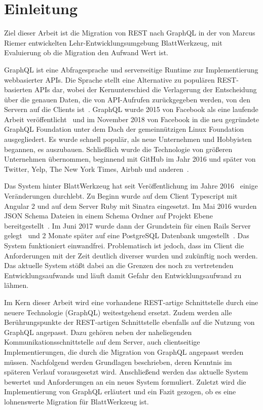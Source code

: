 
\chapter{Einleitung}
\label{sec:introduction}
 
Ziel dieser Arbeit ist die Migration von REST nach GraphQL in der von Marcus Riemer entwickelten Lehr-Entwicklungsumgebung BlattWerkzeug, mit Evaluierung ob die Migration den Aufwand Wert ist. 

GraphQL ist eine Abfragesprache und serverseitige Runtime zur Implementierung webbasierter APIs. Die Sprache
stellt eine Alternative zu populären REST-basierten APIs dar, wobei der Kernunterschied die
Verlagerung der Entscheidung über die genauen Daten, die von API-Aufrufen zurückgegeben werden, von den Servern auf die Clients ist~\cite{introduction}.
GraphQL wurde 2015 von Facebook als eine laufende Arbeit veröffentlicht~\cite{graphql-first-commit} und im November 2018 von Facebook in die neu gegründete GraphQL Foundation unter dem Dach der gemeinnützigen Linux Foundation ausgegliedert. Es wurde schnell populär, als neue Unternehmen und Hobbyisten begannen, es auszubauen. Schließlich wurde die Technologie von größeren Unternehmen übernommen, beginnend mit GitHub im Jahr 2016 und später von Twitter, Yelp, The New York Times, Airbnb und anderen~\cite{graphql-users}.

Das System hinter BlattWerkzeug hat seit Veröffentlichung im Jahre 2016~\cite{riemer2016} einige Veränderungen durchlebt. Zu Beginn wurde auf dem Client Typescript mit Angular 2 und auf dem Server Ruby mit Sinatra eingesetzt. Im Mai 2016 wurden JSON Schema Dateien in einem Schema Ordner auf Projekt Ebene bereitgestellt~\cite{riemerJSONSchemaCommit}.
Im Juni 2017 wurde dann der Grundstein für einen Rails Server gelegt~\cite{riemerRailsCommit} und 2 Monate später auf eine PostgreSQL Datenbank umgestellt~\cite{riemerPostgresCommit}. 
Das System funktioniert einwandfrei. Problematisch ist jedoch, dass im Client die Anforderungen mit der Zeit deutlich diverser wurden und zukünftig noch werden. 
Das aktuelle System stößt dabei an die Grenzen des noch zu vertretenden Entwicklungsaufwands und läuft damit Gefahr den Entwicklungsaufwand zu lähmen.

Im Kern dieser Arbeit wird eine vorhandene REST-artige Schnittstelle durch eine neuere Technologie (GraphQL) weitestgehend ersetzt. Zudem werden alle Berührungspunkte der REST-artigen Schnittstelle ebenfalls auf die Nutzung von GraphQL angepasst. Dazu gehören neben der naheliegenden Kommunikationsschnittstelle auf dem Server, auch clientseitige Implementierungen, die durch die Migration von GraphQL angepasst werden müssen. 
Nachfolgend werden Grundlagen beschrieben, deren Kenntnis im späteren Verlauf vorausgesetzt wird. Anschließend werden das aktuelle System bewertet und Anforderungen an ein neues System formuliert. 
Zuletzt wird die Implementierung von GraphQL
erläutert und ein Fazit gezogen, ob es eine lohnenswerte Migration für BlattWerkzeug ist.
 


